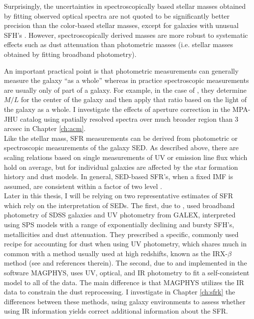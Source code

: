 Surprisingly, the uncertainties in spectroscopically based stellar
masses obtained by fitting observed optical spectra
\citep{kauffmann_stellar_2003, 2012MNRAS.421..314C} are not quoted to
be significantly better precision than the color-based stellar masses,
except for galaxies with unusual SFH's
\citet{2005MNRAS.362...41G}. However, spectroscopically derived masses
are more robust to systematic effects such as dust attenuation than
photometric masses (i.e. stellar masses obtained by fitting broadband
photometry).

An important practical point is that photometric measurements can
generally measure the galaxy ``as a whole'' whereas in practice
spectroscopic measurements are usually only of part of a galaxy. For
example, in the case of \citet{kauffmann_stellar_2003}, they determine
$M/L$ for the center of the galaxy and then apply that ratio based on
the light of the galaxy as a whole.  I investigate the effects of
aperture correction in the MPA-JHU catalog using spatially resolved
spectra over much broader region than 3 arcsec in Chapter
\ref{ch:acm}.\\

Like the stellar mass, SFR measurements can be derived from
photometric or spectroscopic measurements of the galaxy SED. As
described above, there are scaling relations based on single
measurements of UV or emission line flux which hold on average, but
for individual galaxies are affected by the star formation history and
dust models.  In general, SED-based SFR's, when a fixed IMF is
assumed, are consistent within a factor of two level
\citep{conroy_modeling_2013}.\\

Later in this thesis, I will be relying on two representative
estimates of SFR which rely on the interpretation of SEDs.  The first,
due to \citet{salim_uv_2007}, used broadband photometry of SDSS
galaxies and UV photometry from GALEX, interpreted using SPS models
with a range of exponentially declining and bursty SFH's,
metallicities and dust attenuation. They prescribed a specific,
commonly used recipe for accounting for dust when using UV photometry,
which shares much in common with a method usually used at high
redshifts, known as the IRX-$\beta$ method (see \citealt{overzier11a}
and references therein). The second, due to
\citet{da_cunha_simple_2008} and implemented in the software MAGPHYS,
uses UV, optical, and IR photometry to fit a self-consistent model to
all of the data. The main difference is that MAGPHYS utilizes the IR
data to constrain the dust reprocessing. I investigate in Chapter
\ref{ch:sfrk} the differences between these methods, using galaxy
environments to assess whether using IR information yields correct
additional information about the SFR.

